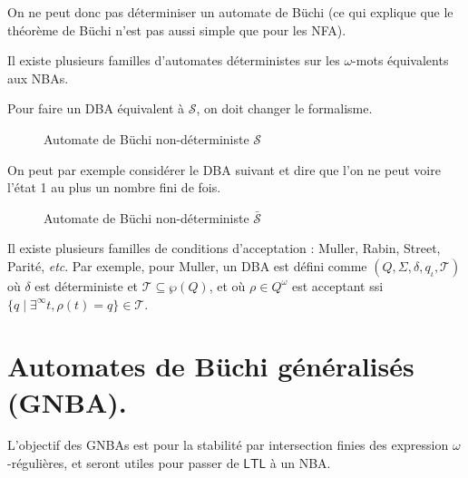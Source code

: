 \documentclass[./main]{subfiles}
\begin{document}
  On ne peut donc pas déterminiser un automate de Büchi (ce qui explique que le théorème de Büchi n'est pas aussi simple que pour les NFA).
  
  Il existe plusieurs familles d'automates déterministes sur les $\omega$-mots équivalents aux NBAs.

  Pour faire un DBA équivalent à $\mathcal{S}$, on doit changer le formalisme.

  \begin{figure}[H]
    \centering
    \caption{Automate de Büchi non-déterministe $\mathcal{S}$}
  \end{figure}

  On peut par exemple considérer le DBA suivant et dire que l'on ne peut voire l'état 1 au plus un nombre fini de fois.

  \begin{figure}[H]
    \centering
    \caption{Automate de Büchi non-déterministe $\bar{\mathcal{S}}$}
  \end{figure}

  Il existe plusieurs familles de conditions d'acceptation : Muller, Rabin, Street, Parité, \textit{etc}.
  Par exemple, pour Muller, un DBA est défini comme $(Q, \Sigma, \delta, q_\iota, \mathcal{T})$ où $\delta$ est déterministe et $\mathcal{T} \subseteq \wp(Q)$, et où $\rho \in Q^\omega$ est acceptant ssi $\{q  \mid \exists ^\infty t, \rho(t) = q\} \in \mathcal{T}$.

  \section{Automates de Büchi généralisés (GNBA).}

  L'objectif des GNBAs est pour la stabilité par intersection finies des expression $\omega$-régulières, et seront utiles pour passer de $\mathsf{LTL}$ à un NBA.
\end{document}

